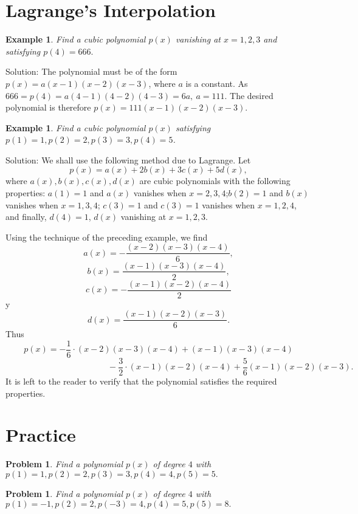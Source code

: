 \documentclass[11pt, openany]{book}
\theoremstyle{change} \theoremheaderfont{\blue\sffamily\bfseries}
\newtheorem{exa}[thm]{Example}
\newtheorem{pro}[thm]{Problem}
\theoremstyle{nonumberplain} \theoremheaderfont{\sffamily\bfseries}
\newcommand{\í}{\'{\i}}
\begin{document}
\section{Lagrange's Interpolation}
\begin{exa}
Find a cubic polynomial $p(x)$ vanishing at $x = 1, 2, 3$ and
satisfying $p(4) = 666.$
\end{exa}
Solution: The polynomial must be of the form $p(x) = a(x - 1)(x -
2)(x - 3)$, where $a$ is a constant. As $666 = p(4) = a(4 - 1)(4 -
2)(4 - 3) = 6a, \ a = 111.$ The desired polynomial is therefore
$p(x) = 111(x - 1)(x - 2)(x - 3).$
\begin{exa}
Find a cubic polynomial $p(x)$ satisfying $p(1) = 1, p(2) = 2,
p(3) = 3, p(4) = 5$.
\end{exa}
Solution: We shall use the following method due to Lagrange. Let
$$p(x) = a(x) + 2b(x) + 3c(x) + 5d(x),$$where $a(x), b(x), c(x), d(x)$ are cubic polynomials with
the following properties: $a(1) = 1$ and $a(x)$ vanishes when $x =
2, 3, 4$;$b(2) = 1$ and $b(x)$ vanishes when $x = 1, 3, 4$; $c(3)
= 1$ and $c(3) = 1$ vanishes when $x = 1, 2, 4$, and finally,
$d(4) = 1$, $d(x)$ vanishing at $x = 1, 2, 3.$


Using the technique of the preceding example, we find
$$a(x) = -\frac{(x - 2)(x - 3)(x - 4)}{6},$$
$$b(x) = \frac{(x - 1)(x - 3)(x - 4)}{2},$$
$$c(x) = -\frac{(x - 1)(x - 2)(x - 4)}{2}$$y
$$d(x) = \frac{(x - 1)(x - 2)(x - 3)}{6}.$$
Thus
$$p(x) = -\frac{1}{6}\cdot (x - 2)(x - 3)(x - 4) + (x - 1)(x - 3)(x - 4)$$
$$ \hspace{2in} - \frac{3}{2}\cdot (x - 1)(x - 2)(x - 4) + \frac{5}{6}(x - 1)(x - 2)(x - 3).$$
It is left to the reader to verify that the polynomial satisfies
the required properties.

\section*{Practice}
\begin{multicols}{2}\columnseprule 1pt \columnsep 25pt

\begin{pro}  Find a polynomial $p(x)$ of degree $4$ with
$p(1) = 1, p(2) = 2, p(3) = 3, p(4) = 4, p(5) = 5.$\end{pro}
\begin{pro}  Find a polynomial $p(x)$ of degree $4$ with
$p(1) = -1, p(2) = 2, p(-3) = 4, p(4) = 5, p(5) = 8.$\end{pro}
\end{multicols}
\end{document}

